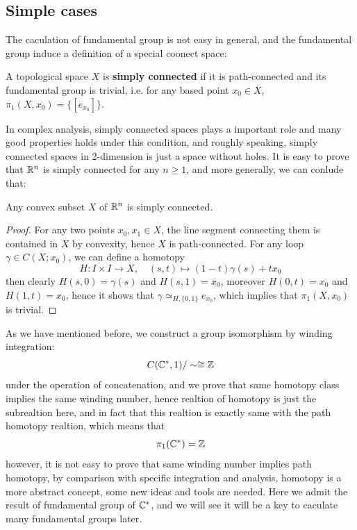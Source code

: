\subsection{Simple cases}

The caculation of fundamental group is not easy in general, and the fundamental group induce a definition of a special coonect space:
\begin{definition}
    A topological space \(X\) is \textbf{simply connected} if it is path-connected and its fundamental group is trivial, i.e. for any based point \(x_0 \in X\), \(\pi_1(X,x_0) = \{[e_{x_0}]\}\).
\end{definition}

In complex analysis, simply connected spaces plays a important role and many good properties holds under this condition, and roughly speaking, simply connected spaces in 2-dimension is just a space without holes. It is easy to prove that \(\mathbb{R}^n\) is simply connected for any \(n \geq 1\), and more generally, we can conlude that:
\begin{proposition}
    Any convex subset \(X\) of \(\mathbb{R}^n\) is simply connected.
\end{proposition}
\begin{proof}
    For any two points \(x_0,x_1 \in X\), the line segment connecting them is contained in \(X\) by convexity, hence \(X\) is path-connected. For any loop \(\gamma \in C(X;x_0)\), we can define a homotopy
    \[H:I \times I \to X, \quad (s,t) \mapsto (1-t)\gamma(s) + t x_0\]
    then clearly \(H(s,0) = \gamma(s)\) and \(H(s,1) = x_0\), moreover \(H(0,t) = x_0\) and \(H(1,t) = x_0\), hence it shows that \(\gamma \simeq_{H,\{0,1\}} e_{x_0}\), which implies that \(\pi_1(X,x_0)\) is trivial.
\end{proof}

As we have mentioned before, we construct a group isomorphism by winding integration:
\[C(\mathbb{C}^*,1)/\sim \cong \mathbb{Z}\]
under the operation of concatenation, and we prove that same homotopy class implies the same winding number, hence realtion of homotopy is just the subrealtion here, and in fact that this realtion is exactly same with the path homotopy realtion, which means that
\[\pi_1(\mathbb{C}^*) = \mathbb{Z}\]
however, it is not easy to prove that same winding number implies path homotopy, by comparison with specific integration and analysis, homotopy is a more abstract concept, some new ideas and tools are needed. Here we admit the result of fundamental group of \(\mathbb{C}^*\), and we will see it will be a key to caculate many fundamental groups later.

